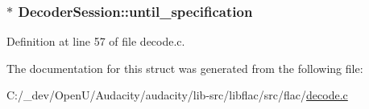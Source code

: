 \subsubsection[{\texorpdfstring{until\+\_\+specification}{until_specification}}]{$\ast$ Decoder\+Session\+::until\+\_\+specification}\hypertarget{struct_decoder_session_ae891e1c86136bec8b288cd5d48b3e7ce}{}\label{struct_decoder_session_ae891e1c86136bec8b288cd5d48b3e7ce}


Definition at line 57 of file decode.\+c.



The documentation for this struct was generated from the following file\+:\begin{DoxyCompactItemize}
\item 
C\+:/\+\_\+dev/\+Open\+U/\+Audacity/audacity/lib-\/src/libflac/src/flac/\hyperlink{libflac_2src_2flac_2decode_8c}{decode.\+c}\end{DoxyCompactItemize}
